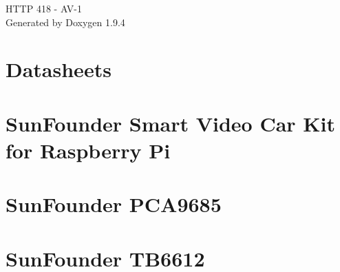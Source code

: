 \documentclass[twoside]{book}
\newcommand{\+}{\discretionary{\mbox{\scriptsize$\hookleftarrow$}}{}{}}
\newcommand{\clearemptydoublepage}{%
    \newpage{\pagestyle{empty}\cleardoublepage}%
  }
\begin{document}
  \raggedbottom
    \hypersetup{pageanchor=false,
                bookmarksnumbered=true,
                pdfencoding=unicode
               }
  \begin{titlepage}
  \vspace*{7cm}
  \begin{center}%
  {\Large HTTP 418 -\/ AV-\/1}\\
  \vspace*{1cm}
  {\large Generated by Doxygen 1.9.4}\\
  \end{center}
  \end{titlepage}
  \clearemptydoublepage
  \tableofcontents
  \clearemptydoublepage
  \hypersetup{pageanchor=true}
\chapter{Datasheets}
\label{md_src_picar__module__sun_founder__pi_car__v_datasheet__r_e_a_d_m_e}

\chapter{Sun\+Founder Smart Video Car Kit for Raspberry Pi}
\label{md_src_picar__module__sun_founder__pi_car__v__r_e_a_d_m_e}

\chapter{Sun\+Founder PCA9685}
\label{md_src_picar__module__sun_founder__pi_car_picar__sun_founder__p_c_a9685__r_e_a_d_m_e}

\chapter{Sun\+Founder TB6612}
\label{md_src_picar__module__sun_founder__pi_car_picar__sun_founder__t_b6612__r_e_a_d_m_e}

\end{document}
